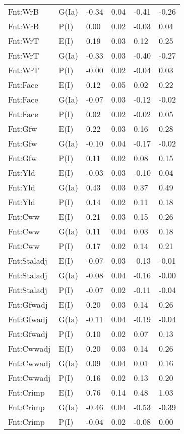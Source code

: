 \begin{center}
\begin{longtable}{|p{1.1in}|p{0.7in}|p{0.7in}|p{0.6in}|p{0.6in}|p{0.6in}|}
  Fnt:WrB & G(Ia) & -0.34 & 0.04 & -0.41 & -0.26 \\ 
  Fnt:WrB & P(I) & 0.00 & 0.02 & -0.03 & 0.04 \\ 
  Fnt:WrT & E(I) & 0.19 & 0.03 & 0.12 & 0.25 \\ 
  Fnt:WrT & G(Ia) & -0.33 & 0.03 & -0.40 & -0.27 \\ 
  Fnt:WrT & P(I) & -0.00 & 0.02 & -0.04 & 0.03 \\ 
  Fnt:Face & E(I) & 0.12 & 0.05 & 0.02 & 0.22 \\ 
  Fnt:Face & G(Ia) & -0.07 & 0.03 & -0.12 & -0.02 \\ 
  Fnt:Face & P(I) & 0.02 & 0.02 & -0.02 & 0.05 \\ 
  Fnt:Gfw & E(I) & 0.22 & 0.03 & 0.16 & 0.28 \\ 
  Fnt:Gfw & G(Ia) & -0.10 & 0.04 & -0.17 & -0.02 \\ 
  Fnt:Gfw & P(I) & 0.11 & 0.02 & 0.08 & 0.15 \\ 
  Fnt:Yld & E(I) & -0.03 & 0.03 & -0.10 & 0.04 \\ 
  Fnt:Yld & G(Ia) & 0.43 & 0.03 & 0.37 & 0.49 \\ 
  Fnt:Yld & P(I) & 0.14 & 0.02 & 0.11 & 0.18 \\ 
  Fnt:Cww & E(I) & 0.21 & 0.03 & 0.15 & 0.26 \\ 
  Fnt:Cww & G(Ia) & 0.11 & 0.04 & 0.03 & 0.18 \\ 
  Fnt:Cww & P(I) & 0.17 & 0.02 & 0.14 & 0.21 \\ 
  Fnt:Staladj & E(I) & -0.07 & 0.03 & -0.13 & -0.01 \\ 
  Fnt:Staladj & G(Ia) & -0.08 & 0.04 & -0.16 & -0.00 \\ 
  Fnt:Staladj & P(I) & -0.07 & 0.02 & -0.11 & -0.04 \\ 
  Fnt:Gfwadj & E(I) & 0.20 & 0.03 & 0.14 & 0.26 \\ 
  Fnt:Gfwadj & G(Ia) & -0.11 & 0.04 & -0.19 & -0.04 \\ 
  Fnt:Gfwadj & P(I) & 0.10 & 0.02 & 0.07 & 0.13 \\ 
  Fnt:Cwwadj & E(I) & 0.20 & 0.03 & 0.14 & 0.26 \\ 
  Fnt:Cwwadj & G(Ia) & 0.09 & 0.04 & 0.01 & 0.16 \\ 
  Fnt:Cwwadj & P(I) & 0.16 & 0.02 & 0.13 & 0.20 \\ 
  Fnt:Crimp & E(I) & 0.76 & 0.14 & 0.48 & 1.03 \\ 
  Fnt:Crimp & G(Ia) & -0.46 & 0.04 & -0.53 & -0.39 \\ 
  Fnt:Crimp & P(I) & -0.04 & 0.02 & -0.08 & 0.00 \\ 

\end{longtable}
\end{center}
